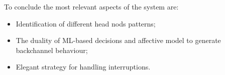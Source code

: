 To conclude the most relevant aspects of the system are:
\begin{itemize}
	\item Identification of different head nods patterns;
	\item The duality of \ac{ML}-based decisions and affective model to generate backchannel behaviour;
	\item Elegant strategy for handling interruptions.
\end{itemize}